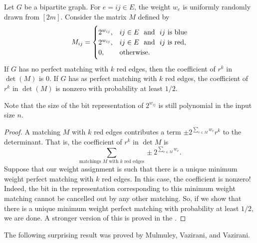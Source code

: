 \begin{ftheo}
	\label{randomized red-blue matching}
	Let $G$ be a bipartite graph. For $e = ij \in E$, the weight $w_e$ is uniformly randomly drawn from $[2m]$. Consider the matrix $M$ defined by
	\[ M_{ij} = \begin{cases} 2^{w_{ij}}, & \text{$ij \in E$ \text{ and } $ij$ is blue} \\ 2^{w_{ij}}, & \text{$ij \in E$ \text{ and } $ij$ is red}, \\ 0, & \text{otherwise.} \end{cases} \]
	If $G$ has no perfect matching with $k$ red edges, then the coefficient of $r^k$ in $\det(M)$ is $0$. If $G$ has as perfect matching with $k$ red edges, the coefficient of $r^k$ in $\det(M)$ is nonzero with probability at least $1/2$.
\end{ftheo}
Note that the size of the bit representation of $2^{w_{ij}}$ is still polynomial in the input size $n$.
\begin{proof}
	A matching $M$ with $k$ red edges contributes a term $\pm 2^{\sum_{e \in M} w_e} r^k$ to the determinant. That is, the coefficient of $r^k$ in $\det M$ is
	\[ \sum_{\text{matchings $M$ with $k$ red edges}} \pm 2^{\sum_{e \in M} w_e}. \]
	Suppose that our weight assignment is such that there is a unique minimum weight perfect matching with $k$ red edges. In this case, the coefficient is nonzero! Indeed, the bit in the representation corresponding to this minimum weight matching cannot be cancelled out by any other matching. So, if we show that there is a unique minimum weight perfect matching with probability at least $1/2$, we are done. A stronger version of this is proved in the .
\end{proof}

The following surprising result was proved by Mulmuley, Vazirani, and Vazirani.

